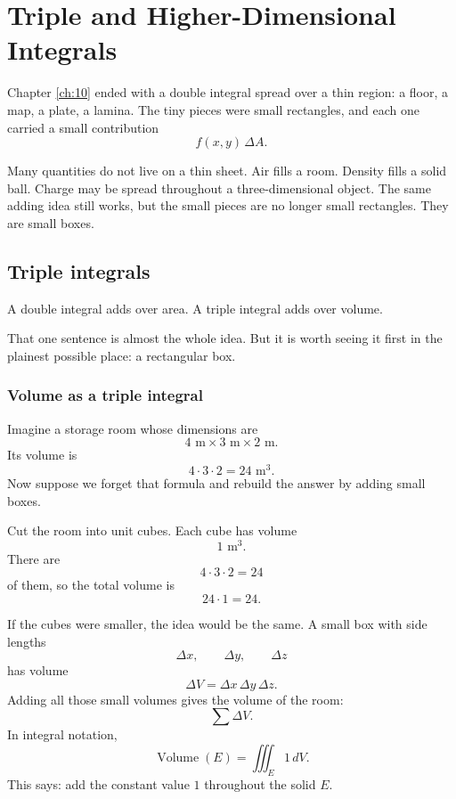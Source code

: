 
\chapter{Triple and Higher-Dimensional Integrals}
\label{ch:11}

Chapter \ref{ch:10} ended with a double integral spread over a thin region: a floor, a
map, a plate, a lamina.  The tiny pieces were small rectangles, and each one carried a
small contribution
\[
    f(x,y)\,\Delta A.
\]

Many quantities do not live on a thin sheet.  Air fills a room.  Density fills a solid ball.
Charge may be spread throughout a three-dimensional object.  The same adding idea
still works, but the small pieces are no longer small rectangles.  They are small boxes.

\section{Triple integrals}
\label{sec:11.1}

A double integral adds over area.  A triple integral adds over volume.

That one sentence is almost the whole idea.  But it is worth seeing it first in the
plainest possible place: a rectangular box.

\subsection{Volume as a triple integral}

Imagine a storage room whose dimensions are
\[
    4\text{ m}\times 3\text{ m}\times 2\text{ m}.
\]
Its volume is
\[
    4\cdot 3\cdot 2=24\text{ m}^3.
\]
Now suppose we forget that formula and rebuild the answer by adding small boxes.

Cut the room into unit cubes.  Each cube has volume
\[
    1\text{ m}^3.
\]
There are
\[
    4\cdot3\cdot2=24
\]
of them, so the total volume is
\[
    24\cdot1=24.
\]

If the cubes were smaller, the idea would be the same.  A small box with side lengths
\[
    \Delta x,\qquad \Delta y,\qquad \Delta z
\]
has volume
\[
    \Delta V=\Delta x\,\Delta y\,\Delta z.
\]
Adding all those small volumes gives the volume of the room:
\[
    \sum \Delta V.
\]
In integral notation,
\[
\boxed{
    \operatorname{Volume}(E)=\iiint_E 1\,dV.
}
\]
This says: add the constant value \(1\) throughout the solid \(E\).

